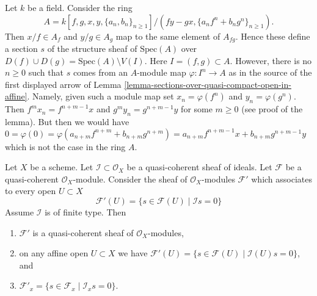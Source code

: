 \begin{example}
\label{example-does-not-work-in-general}
Let $k$ be a field. Consider the ring
$$
A = k[f, g, x, y, \{a_n, b_n\}_{n \geq1}]/
(fy - gx, \{a_nf^n + b_ng^n\}_{n \geq 1}).
$$
Then $x/f \in A_f$ and $y/g \in A_g$ map to the same element of
$A_{fg}$. Hence these define a section $s$ of the structure sheaf
of $\text{Spec}(A)$ over $D(f) \cup D(g) = \text{Spec}(A) \setminus V(I)$.
Here $I = (f, g) \subset A$. However, there is no
$n \geq 0$ such that $s$ comes from an $A$-module map
$\varphi : I^n \to A$ as in the source of the first displayed arrow
of Lemma \ref{lemma-sections-over-quasi-compact-open-in-affine}.
Namely, given such a module map set
$x_n = \varphi(f^n)$ and $y_n = \varphi(g^n)$.
Then $f^mx_n = f^{n + m - 1}x$ and
$g^my_n = g^{n + m - 1}y$ for some $m \geq 0$ (see proof
of the lemma). But then we would have
$0 = \varphi(0) =
\varphi(a_{n + m}f^{n + m} + b_{n + m}g^{n + m}) =
a_{n + m}f^{n + m - 1}x + b_{n + m}g^{n + m - 1}y$ which is not the case
in the ring $A$.
\end{example}

\begin{lemma}
\label{lemma-sections-annihilated-by-ideal}
Let $X$ be a scheme.
Let $\mathcal{I} \subset \mathcal{O}_X$ be a quasi-coherent sheaf of ideals.
Let $\mathcal{F}$ be a quasi-coherent $\mathcal{O}_X$-module.
Consider the sheaf of $\mathcal{O}_X$-modules $\mathcal{F}'$
which associates to every open $U \subset X$
$$
\mathcal{F}'(U)
=
\{s \in \mathcal{F}(U) \mid
\mathcal{I}s = 0\}
$$
Assume $\mathcal{I}$ is of finite type. Then
\begin{enumerate}
\item $\mathcal{F}'$ is a quasi-coherent sheaf of $\mathcal{O}_X$-modules,
\item on any affine open $U \subset X$ we have
$\mathcal{F}'(U) = \{s \in \mathcal{F}(U) \mid \mathcal{I}(U)s = 0\}$, and
\item $\mathcal{F}'_x = \{s \in \mathcal{F}_x \mid \mathcal{I}_x s = 0\}$.
\end{enumerate}
\end{lemma}

